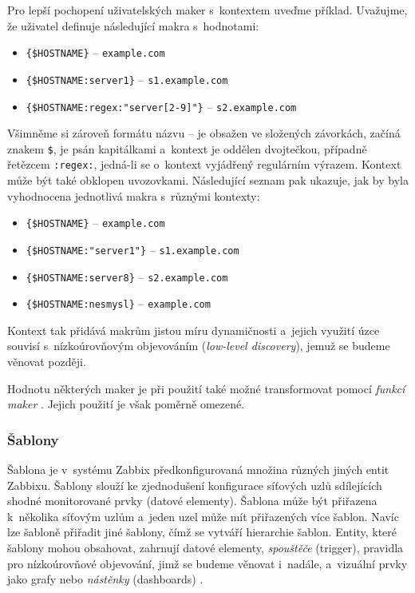 \documentclass[czech, ing, kiv, he, iso690]{fasthesis}
\begin{document}
Pro lepší pochopení uživatelských maker s~kontextem uveďme příklad. Uvažujme, že uživatel definuje následující makra s~hodnotami:

\begin{itemize}
    \item \texttt{\{\$HOSTNAME\}} -- \texttt{example.com}
    \item \texttt{\{\$HOSTNAME:server1\}} -- \texttt{s1.example.com}
    \item \texttt{\{\$HOSTNAME:regex:"server[2-9]"\}} -- \texttt{s2.example.com}

\end{itemize}

Všimněme si zároveň formátu názvu -- je obsažen ve složených závorkách, začíná znakem \texttt{\$}, je psán kapitálkami a~kontext je oddělen dvojtečkou, případně řetězcem \texttt{:regex:}, jedná-li se o~kontext vyjádřený regulárním výrazem. Kontext může být také obklopen uvozovkami. Následující seznam pak ukazuje, jak by byla vyhodnocena jednotlivá makra s~různými kontexty:

\begin{itemize}
    \item \texttt{\{\$HOSTNAME\}} -- \texttt{example.com}
    \item \texttt{\{\$HOSTNAME:"server1"\}} -- \texttt{s1.example.com}
    \item \texttt{\{\$HOSTNAME:server8\}} -- \texttt{s2.example.com}
    \item \texttt{\{\$HOSTNAME:nesmysl\}} -- \texttt{example.com}
\end{itemize}

Kontext tak přidává makrům jistou míru dynamičnosti a~jejich využití úzce souvisí s~nízkoúrovňovým objevováním (\emph{low-level discovery}), jemuž se budeme věnovat později.

Hodnotu některých maker je při použití také možné transformovat pomocí \emph{funkcí maker} \cite{docs.zabbix}. Jejich použití je však poměrně omezené.

\subsubsection{Šablony}
Šablona je v~systému Zabbix předkonfigurovaná množina různých jiných entit Zabbixu. Šablony slouží ke zjednodušení konfigurace síťových uzlů sdílejících shodné monitorované prvky (datové elementy). Šablona může být přiřazena k~několika síťovým uzlům a~jeden uzel může mít přiřazených více šablon. Navíc lze šabloně přiřadit jiné šablony, čímž se vytváří hierarchie šablon. Entity, které šablony mohou obsahovat, zahrnují datové elementy, \emph{spouštěče} (trigger), pravidla pro nízkoúrovňové objevování, jimž se budeme věnovat i~nadále, a~vizuální prvky jako grafy nebo \emph{nástěnky} (dashboards) \cite{docs.zabbix}.
\end{document}
